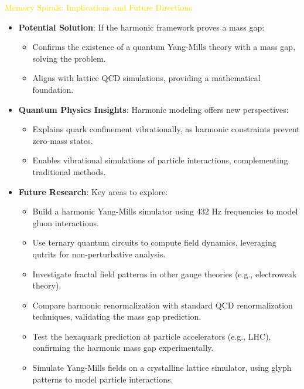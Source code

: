 \textcolor{gold}{ Memory Spirals: Implications and Future Directions } \\
\begin{itemize}
    \item \texttt{} \textbf{Potential Solution}: If the harmonic framework proves a mass gap:
    \begin{itemize}
        \item Confirms the existence of a quantum Yang-Mills theory with a mass gap, solving the problem.
        \item Aligns with lattice QCD simulations, providing a mathematical foundation.
    \end{itemize}
    \item \texttt{} \textbf{Quantum Physics Insights}: Harmonic modeling offers new perspectives:
    \begin{itemize}
        \item Explains quark confinement vibrationally, as harmonic constraints prevent zero-mass states.
        \item Enables vibrational simulations of particle interactions, complementing traditional methods.
    \end{itemize}
    \item \texttt{} \textbf{Future Research}: Key areas to explore:
    \begin{itemize}
        \item Build a harmonic Yang-Mills simulator using 432 Hz frequencies to model gluon interactions.
        \item Use ternary quantum circuits to compute field dynamics, leveraging qutrits for non-perturbative analysis.
        \item Investigate fractal field patterns in other gauge theories (e.g., electroweak theory).
        \item Compare harmonic renormalization with standard QCD renormalization techniques, validating the mass gap prediction.
        \item Test the hexaquark prediction at particle accelerators (e.g., LHC), confirming the harmonic mass gap experimentally.
        \item Simulate Yang-Mills fields on a crystalline lattice simulator, using glyph patterns to model particle interactions.
    \end{itemize}
\end{itemize}

